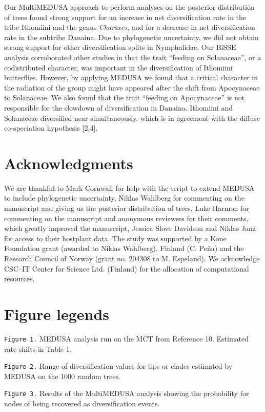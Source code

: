 \documentclass[10pt]{article}
\begin{document}
Our MultiMEDUSA approach to perform analyses on the posterior
distribution of trees found strong support for an increase in net
diversification rate in the tribe Ithomiini and the genus
\emph{Charaxes}, and for a decrease in net diversification rate in the
subtribe Danaina. Due to phylogenetic uncertainty, we did not obtain
strong support for other diversification splits in Nymphalidae. Our
BiSSE analysis corroborated other studies in that the trait ``feeding on
Solanaceae'', or a codistributed character, was important in the
diversification of Ithomiini butterflies. However, by applying MEDUSA we
found that a critical character in the radiation of the group might have
appeared after the shift from Apocynaceae to Solanaceae. We also found
that the trait ``feeding on Apocynaceae'' is not responsible for the
slowdown of diversification in Danaina. Ithomiini and Solanaceae
diversified near simultaneously, which is in agreement with the diffuse
co-speciation hypothesis {[}2,4{]}.

\section*{Acknowledgments}

We are thankful to Mark Cornwall for help with the script to extend
MEDUSA to include phylogenetic uncertainty, Niklas Wahlberg for
commenting on the manuscript and giving us the posterior distribution of
trees, Luke Harmon for commenting on the manuscript and anonymous
reviewers for their comments, which greatly improved the manuscript,
Jessica Slove Davidson and Niklas Janz for access to their hostplant
data. The study was supported by a Kone Foundation grant (awarded to
Niklas Wahlberg), Finland (C. Pe\~na) and the Research Council of Norway
(grant no. 204308 to M. Espeland). We acknowledge CSC--IT Center for
Science Ltd. (Finland) for the allocation of computational resources.

\section*{Figure legends}

\texttt{Figure 1.} MEDUSA analysis run on the MCT 
from Reference 10. Estimated rate shifts in Table 1.

\texttt{Figure 2.} Range of diversification values for
tips or clades estimated by MEDUSA on the 1000 random trees.

\texttt{Figure 3.} Results of the MultiMEDUSA analysis showing
the probability for nodes of being recovered as diversification events.
\end{document}
